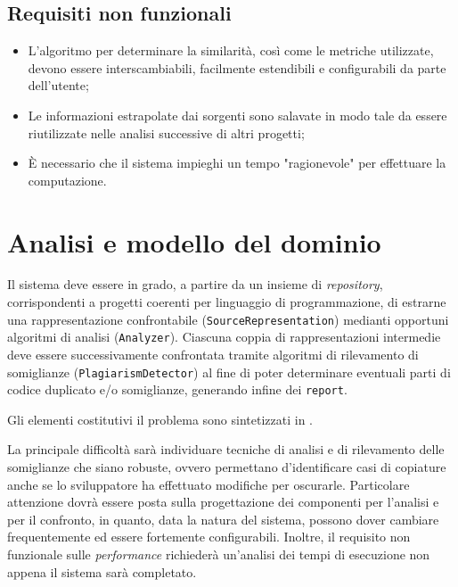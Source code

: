 \subsection*{Requisiti non funzionali}
\begin{itemize}
    \item L'algoritmo per determinare la similarità, così come le metriche utilizzate, devono essere interscambiabili, facilmente estendibili e configurabili da parte dell'utente;
    \item Le informazioni estrapolate dai sorgenti sono salavate in modo tale da essere riutilizzate nelle analisi successive di altri progetti;
    \item \`E necessario che il sistema impieghi un tempo "ragionevole" per effettuare la computazione.
\end{itemize}

\section{Analisi e modello del dominio}
Il sistema deve essere in grado, a partire da un insieme di \textit{repository}, corrispondenti a progetti coerenti per linguaggio di programmazione, di estrarne una rappresentazione confrontabile (\texttt{SourceRepresentation}) medianti opportuni algoritmi di analisi (\texttt{Analyzer}).
%
Ciascuna coppia di rappresentazioni intermedie deve essere successivamente confrontata tramite algoritmi di rilevamento di somiglianze (\texttt{PlagiarismDetector}) al fine di poter determinare eventuali parti di codice duplicato e/o somiglianze, generando infine dei \texttt{report}.

Gli elementi costitutivi il problema sono sintetizzati in .

La principale difficoltà sarà individuare tecniche di analisi e di rilevamento delle somiglianze che siano robuste, ovvero permettano d'identificare casi di copiature anche se lo sviluppatore ha effettuato modifiche per oscurarle.
%
Particolare attenzione dovrà essere posta sulla progettazione dei componenti per l'analisi e per il confronto, in quanto, data la natura del sistema, possono dover cambiare frequentemente ed essere fortemente configurabili.
%
Inoltre, il requisito non funzionale sulle \textit{performance} richiederà un'analisi dei tempi di esecuzione non appena il sistema sarà completato.

